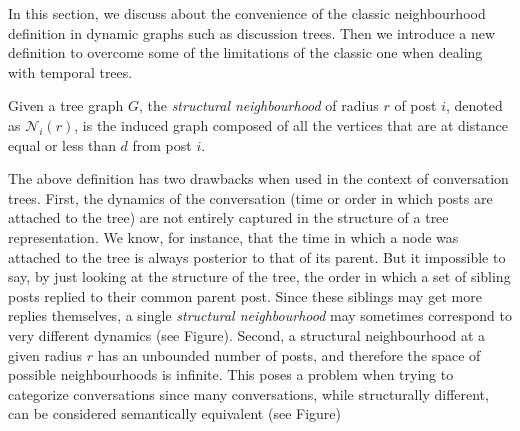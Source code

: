 \documentclass[smallextended]{svjour3}          %
\begin{document}
In this section, we discuss about the convenience of the classic neighbourhood definition in dynamic graphs such as discussion trees. Then we introduce a new definition to overcome some of the limitations of the classic one when dealing with temporal trees.

\begin{definition}
Given a tree graph $G$, the \textit{structural neighbourhood} of radius $r$ of post $i$, denoted as $\mathcal{N}_i(r)$, is the induced graph composed of all the vertices that are at distance equal or less than $d$ from post $i$.
\end{definition}

The above definition has two drawbacks when used in the context of conversation trees.
First, the dynamics of the conversation (time or order in which posts are attached to the tree) are not entirely captured in the structure of a tree representation. We know, for instance, that the time in which a node was attached to the tree is always posterior to that of its parent. But it impossible to say, by just looking at the structure of the tree, the order in which a set of sibling posts replied to their common parent post. Since these siblings may get more replies themselves, a single \textit{structural neighbourhood} may sometimes correspond to very different dynamics (see Figure).
Second, a structural neighbourhood at a given radius $r$ has an unbounded number of posts, and therefore the space of possible neighbourhoods is infinite. This poses a problem when trying to categorize conversations since many conversations, while structurally different, can be considered semantically equivalent (see Figure)
\end{document}
